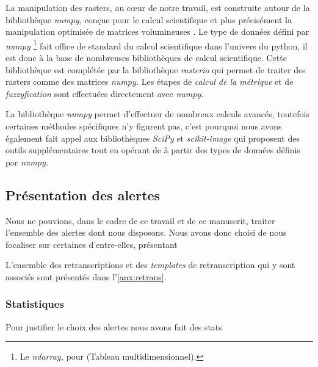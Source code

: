 La manipulation des rasters, au cœur de notre travail, est construite
autour de la bibliothèque \emph{numpy,} conçue pour le calcul
scientifique et plus précisément la manipulation optimisée de matrices
volumineuses \autocite{vanderWalt2011}. Le type de données défini par
\emph{numpy} \footnote{Le \emph{ndarray,} pour
   (Tableau
  multidimensionnel).} fait office de standard du calcul scientifique
dans l'univers du python, il est donc à la base de nombreuses
bibliothèques de calcul scientifique. Cette bibliothèque est complétée
par la bibliothèque \emph{rasterio} \autocite{Mapbox2020} qui permet
de traiter des rasters comme des matrices \emph{numpy.} Les étapes de
\emph{calcul de la métrique} et de \emph{fuzzyfication} sont
effectuées directement avec \emph{numpy.}

La bibliothèque \emph{numpy}
permet d'effectuer de nombreux calculs avancés, toutefois certaines
méthodes spécifiques n'y figurent pas, c'est pourquoi nous avons
également fait appel aux bibliothèques \emph{SciPy} et
\emph{scikit-image} \autocite{vanderWalt2014,Virtanen2020} qui
proposent des outils supplémentaires tout en opérant de à partir des
types de données définis par \emph{numpy.}



\subsection{Présentation des alertes}

Nous ne pouvions, dans le cadre de ce travail et de ce manuscrit,
traiter l'ensemble des alertes dont nous disposons. Nous avons donc
choisi de nous focaliser sur certaines d'entre-elles, présentant 




L'ensemble des retranscriptions et des \emph{templates} de
retranscription qui y sont associés sont présentés dans
l'\autoref{anx:retrans}.


\subsubsection{Statistiques}

Pour justifier le choix des alertes nous avons fait des stats 


